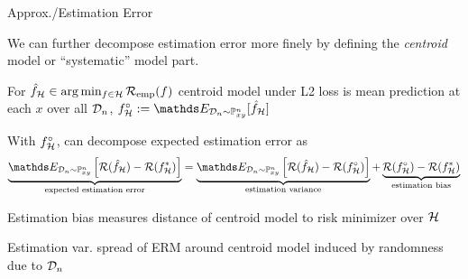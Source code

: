 \documentclass[11pt,compress,t,notes=noshow, xcolor=table]{beamer}
\begin{document}
\begin{vbframe}{Approx./Estimation Error }

\begin{itemizeM}

\item We can further decompose estimation error more finely by defining the \textit{centroid} model or ``systematic'' model part.\\

\item For $\hat{f}_{\mathcal{H}} \in  \arg\min_{f \in \mathcal{H}} \mathcal{R}_{\text{emp}}(f)$ centroid model under L2 loss is mean prediction at each $x$ over all $\mathcal{D}_n$, $f^{\circ}_{\Hspace} := \E_{\D_n \sim \Pxy^n}[\fh_{\Hspace}] $

\item With $f^{\circ}_{\mathcal{H}}$, can decompose expected estimation error as
$$
 \underbrace{\E_{\D_n \sim \Pxy^n}\left[\risk(\hat{f}_{\Hspace}) - \risk(f ^{\ast}_{\Hspace})\right]}_{\text{expected estimation error}} = \underbrace{\E_{\D_n \sim \Pxy^n}\left[\risk(\hat{f}_{\Hspace}) - \risk(f^{\circ}_{\Hspace}) \right]}_{\text{estimation variance}} + \underbrace{\risk(f^{\circ}_{\Hspace})-\risk(f^{\ast}_{\Hspace})}_{\text{estimation bias}}   
$$


\item Estimation bias measures distance of centroid model to risk minimizer over $\mathcal{H}$
\item Estimation var. spread of ERM around centroid model induced by randomness due to $\mathcal{D}_n$

\end{itemizeM}

\end{vbframe}
\end{document}
